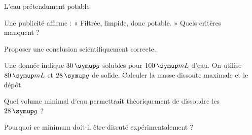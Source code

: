 \par\noindent\begin{minipage}{\linewidth}
\begin{exercice}[3]{L’eau prétendument potable}
\begin{questions}
\item Une publicité affirme : « Filtrée, limpide, donc potable. » Quels critères manquent ?
\item Proposer une conclusion scientifiquement correcte.
\end{questions}
\end{exercice}
\end{minipage}
\label{defi-ex-4}
\begin{questions}
\item Une donnée indique $30\unite g$ solubles pour $100\unite{mL}$ d’eau. On utilise $80\unite{mL}$ et $28\unite g$ de solide. Calculer la masse dissoute maximale et le dépôt.
\item Quel volume minimal d’eau permettrait théoriquement de dissoudre les $28\unite g$ ?
\item Pourquoi ce minimum doit-il être discuté expérimentalement ?
\end{questions}
\pcGrille
